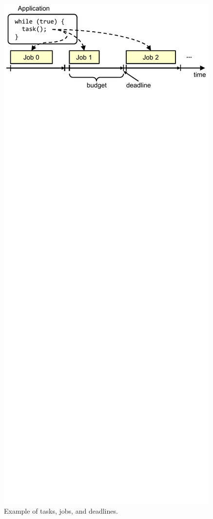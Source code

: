 \begin{figure}
  \begin{center}
    \includegraphics{figs/jobs.pdf}
    \caption{Example of tasks, jobs, and deadlines.}
    \label{fig:background.rts.jobs}
  \end{center}
\end{figure}

